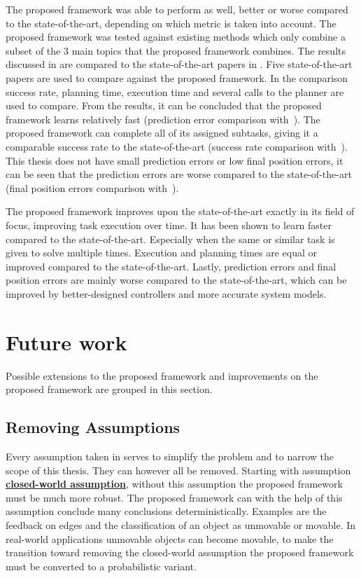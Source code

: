 



The proposed framework was able to perform as well, better or worse compared to the state-of-the-art, depending on which metric is taken into account. The proposed framework was tested against existing methods which only combine a subset of the 3 main topics that the proposed framework combines. 
The results discussed in  are compared to the state-of-the-art papers in . Five state-of-the-art papers are used to compare against the proposed framework. In the comparison success rate, planning time, execution time and several calls to the planner are used to compare. From the results, it can be concluded that the proposed framework learns relatively fast (prediction error comparison with~\cite{wang_affordancebased_2020}). The proposed framework can complete all of its assigned subtasks, giving it a comparable success rate to the state-of-the-art (success rate comparison with~\cite{ellis_navigation_2022}). This thesis does not have small prediction errors or low final position errors, it can be seen that the prediction errors are worse compared to the state-of-the-art (final position errors comparison with~\cite{sabbaghnovin_model_2021}). \bs

The proposed framework improves upon the state-of-the-art exactly in its field of focus, improving task execution over time. It has been shown to learn faster compared to the state-of-the-art. Especially when the same or similar task is given to solve multiple times. Execution and planning times are equal or improved compared to the state-of-the-art. Lastly, prediction errors and final position errors are mainly worse compared to the state-of-the-art, which can be improved by better-designed controllers and more accurate system models. 




\section{Future work}%
\label{sec:future_work}
Possible extensions to the proposed framework and improvements on the proposed framework are grouped in this section.\bs

\subsection{Removing Assumptions}
Every assumption taken in  serves to simplify the problem and to narrow the scope of this thesis. They can however all be removed. Starting with assumption \hyperref[assumption:closed_world]{\textbf{closed-world assumption}}, without this assumption the proposed framework must be much more robust. The proposed framework can with the help of this assumption conclude many conclusions deterministically. Examples are the feedback on edges and the classification of an object as unmovable or movable. In real-world applications unmovable objects can become movable, to make the transition toward removing the closed-world assumption the proposed framework must be converted to a probabilistic variant.\bs

